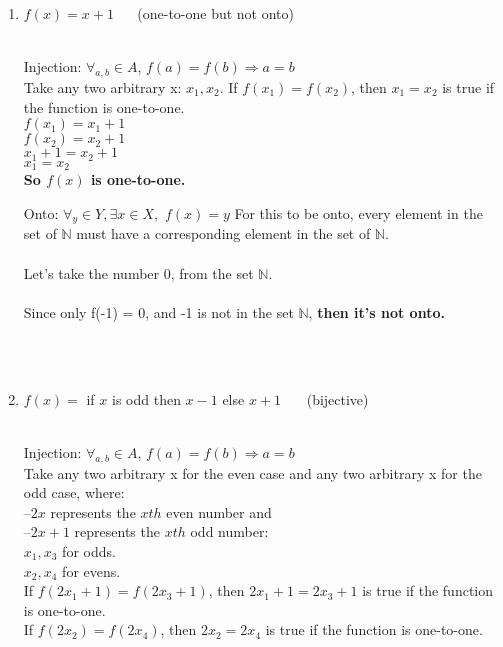 \documentclass[11pt]{article}
\begin{document}
\begin{enumerate}
		\item $f(x) = x+1$ \,\,\,\,\,\, (one-to-one but not onto)\\\\
			\begin{minipage}{0.5\textwidth}
				Injection: $\forall_{a,b} \in A$, $f(a) = f(b) \Rightarrow a = b$ \\
				Take any two arbitrary x: $x_1, x_2$.
				If $f(x_1) = f(x_2)$, then $x_1 = x_2$ is true if the function is one-to-one.\\
				$f(x_1) = x_1+1$\\
				$f(x_2) = x_2+1$\\
				$x_1+1 = x_2+1$\\
				$x_1 = x_2$\\
			\textbf{So $f(x)$ is one-to-one.}\\
			\end{minipage}
			\begin{minipage}{0.5\textwidth}
				Onto: $\forall_{y} \in Y, \exists x \in X,$ $f(x) = y$
				For this to be onto, every element in the set of $\mathbb{N}$ must have a corresponding element in the set of $\mathbb{N}$. \\\\
				Let's take the number 0, from the set $\mathbb{N}$. \\\\
				Since only f(-1) = 0, and -1 is not in the set $\mathbb{N}$, \textbf{then it's not onto.}
			\end{minipage}\\\\
\newpage

		\item $f(x) =$ if $x$ is odd then $x-1$ else $x+1$ \,\,\,\,\,\,\, (bijective) \\\\
			\begin{minipage}{0.5\textwidth}
				Injection: $\forall_{a,b} \in A$, $f(a) = f(b) \Rightarrow a = b$ \\
				Take any two arbitrary x for the even case and any two arbitrary x for the odd case, where:\\
					--$2x$ represents the $xth$ even number and \\
					--$2x+1$ represents the $xth$ odd number: \\
					$x_1, x_3$ for odds. \\
					$x_2, x_4$ for evens.\\
				If $f(2x_1+1) = f(2x_3+1)$, then $2x_1+1 = 2x_3+1$ is true if the function is one-to-one.\\
				If $f(2x_2) = f(2x_4)$, then $2x_2 = 2x_4$ is true if the function is one-to-one.\\
				

\end{minipage}
\end{enumerate}
\end{document}
